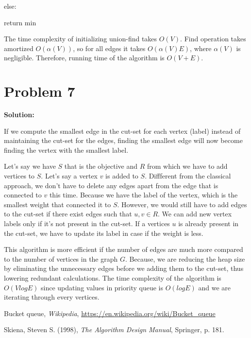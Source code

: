 \documentclass{article}
\begin{document}
\hspace{5mm} else:

\hspace{5mm} \hspace{5mm} return min

The time complexity of initializing union-find takes $O(V)$. Find operation takes amortized $O(\alpha(V))$, so for all edges it takes $O(\alpha(V)E)$, where $\alpha(V)$ is negligible. Therefore, running time of the algorithm is $O(V+E)$.


\section*{Problem 7}
\textbf{Solution:}

If we compute the smallest edge in the cut-set for each vertex (label) instead of maintaining the cut-set for the edges, finding the smallest edge will now become finding the vertex with the smallest label.

Let's say we have $S$ that is the objective and $R$ from which we have to add vertices to $S$. Let's say a vertex $v$ is added to $S$. Diffferent from the classical approach, we don't have to delete any edges apart from the edge that is connected to $v$ this time. Because we have the label of the vertex, which is the smallest weight that connected it to $S$. However, we would still have to add edges to the cut-set if there exist edges such that $u,v \in R$. We can add new vertex labels only if it's not present in the cut-set. If a vertices $u$ is already present in the cut-set, we have to update its label in case if the weight is less.

This algorithm is more efficient if the number of edges are much more compared to the number of vertices in the graph $G$. Because, we are reducing the heap size by eliminating the unnecessary edges before we adding them to the cut-set, thus lowering redundant calculations. The time complexity of the algorithm is $O(VlogE)$ since updating values in priority queue is $O(logE)$ and we are iterating through every vertices.

\begin{thebibliography}{9}

Bucket queue, \emph{Wikipedia}, \url{https://en.wikipedia.org/wiki/Bucket_queue}

Skiena, Steven S. (1998), \emph{The Algorithm Design Manual}, Springer, p. 181.

\end{thebibliography}
\end{document}
